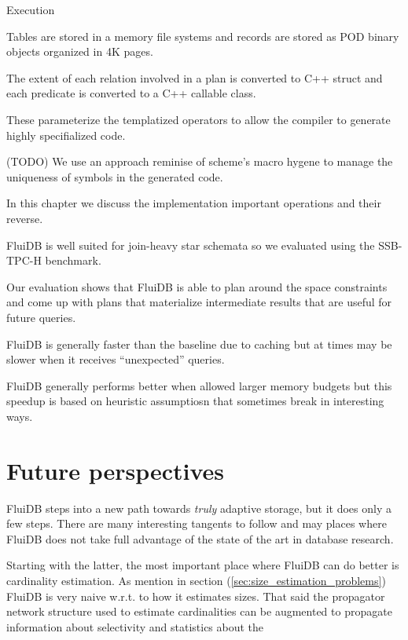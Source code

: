 Execution

\begin{summary}
\item Tables are stored in a memory file systems and records are
  stored as POD binary objects organized in 4K pages.
\item The extent of each relation involved in a plan is converted to
  C++ struct and each predicate is converted to a C++ callable
  class.
\item These parameterize the templatized operators to allow the
  compiler to generate highly specifialized code.
\item (TODO) We use an approach reminise of scheme's macro hygene to manage
  the uniqueness of symbols in the generated code.
\item In this chapter we discuss the implementation important
  operations and their reverse.
\end{summary}

\begin{summary}
\item FluiDB is well suited for join-heavy star schemata so we
  evaluated using the SSB-TPC-H benchmark.
\item Our evaluation shows that FluiDB is able to plan around the
  space constraints and come up with plans that materialize
  intermediate results that are useful for future queries.
\item FluiDB is generally faster than the baseline due to caching but
  at times may be slower when it receives ``unexpected''
  queries.
\item FluiDB generally performs better when allowed larger memory
  budgets but this speedup is based on heuristic assumptiosn that
  sometimes break in interesting ways.
\end{summary}


\section{Future perspectives}

FluiDB steps into a new path towards \emph{truly} adaptive storage,
but it does only a few steps. There are many interesting tangents to
follow and may places where FluiDB does not take full advantage of the
state of the art in database research.

Starting with the latter, the most important place where FluiDB can do
better is cardinality estimation. As mention in section
(\ref{sec:size_estimation_problems}) FluiDB is very naive w.r.t. to
how it estimates sizes. That said the propagator network structure
used to estimate cardinalities can be augmented to propagate
information about selectivity and statistics about the
